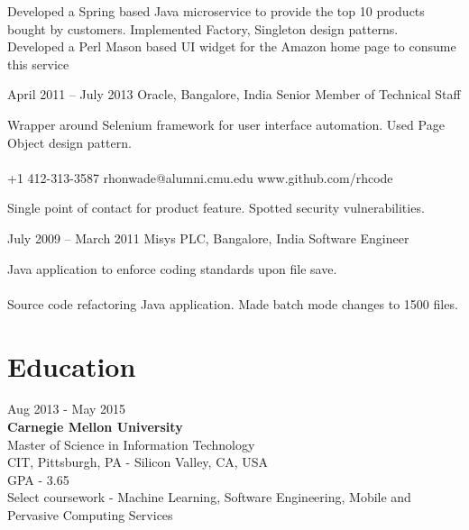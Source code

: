 \documentclass{tccv}
\begin{document}
\begin{eventlist}
Developed a Spring based Java microservice to provide the top 10 products bought by customers. Implemented Factory, Singleton design patterns.\\

Developed a Perl Mason based UI widget for the Amazon home page to consume this service

\item{April 2011 -- July 2013}
     {Oracle, Bangalore, India}
     {Senior Member of Technical Staff}

Wrapper around Selenium framework for user interface automation. Used Page Object design pattern.\\
\\

    {+1 412-313-3587}
    {rhonwade@alumni.cmu.edu}
    {www.github.com/rhcode}

\vspace{0.2in}

Single point of contact for product feature. Spotted security vulnerabilities.

\item{July 2009 -- March 2011}
     {Misys PLC, Bangalore, India}
     {Software Engineer}

Java application to enforce coding standards upon file save.\\
\\

Source code refactoring Java application. Made batch mode changes to 1500 files.\\
\end{eventlist}

\vspace{-0.2in}
\section{Education}

{\hfill\sc Aug 2013 - May 2015}\\
\textbf{Carnegie Mellon University}\\ 
Master of Science in Information Technology\\
CIT, Pittsburgh, PA - Silicon Valley, CA, USA\\
GPA - 3.65\\
Select coursework - Machine Learning, Software Engineering, Mobile and Pervasive Computing Services\\
\end{document}
